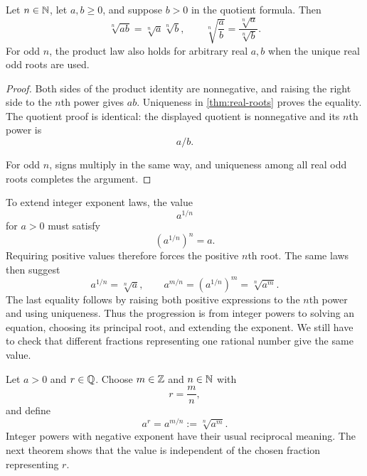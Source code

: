 \begin{proposition}
\label{prop:real-root-laws}
Let \(n\in\mathbb{N}\), let \(a,b\geq0\), and suppose \(b>0\) in the quotient
formula. Then
\[
\sqrt[n]{ab}=\sqrt[n]{a}\sqrt[n]{b},
\qquad
\sqrt[n]{\frac ab}=\frac{\sqrt[n]{a}}{\sqrt[n]{b}}.
\]
For odd \(n\), the product law also holds for arbitrary real \(a,b\) when
the unique real odd roots are used.
\end{proposition}
\begin{proof}
Both sides of the product identity are nonnegative, and raising the right
side to the \(n\)th power gives \(ab\). Uniqueness in
\cref{thm:real-roots} proves the equality. The quotient proof is identical:
the displayed quotient is nonnegative and its \(n\)th power is
\[
a/b.
\]

For odd \(n\), signs multiply in the same way, and uniqueness among all real
odd roots completes the argument.
\end{proof}

To extend integer exponent laws, the value
\[
a^{1/n}
\]
 for $a>0$ must
satisfy
\[
(a^{1/n})^n=a.
\]
 Requiring positive values therefore forces the
positive $n$th root. The same laws then suggest
\[
a^{1/n}=\sqrt[n]{a},\qquad
a^{m/n}=(a^{1/n})^m=\sqrt[n]{a^m}.
\]
The last equality follows by raising both positive expressions to the
$n$th power and using uniqueness. Thus the progression is from integer
powers to solving an equation, choosing its principal root, and extending
the exponent. We still have to check that different fractions representing
one rational number give the same value.

\begin{definition}
\label{def:rational-powers}
Let \(a>0\) and \(r\in\mathbb{Q}\). Choose \(m\in\mathbb{Z}\) and \(n\in\mathbb{N}\) with
\[
r=\frac mn,
\]
and define
\[
\boxed{a^r=a^{m/n}:=\sqrt[n]{a^m}.}
\]
Integer powers with negative exponent have their usual reciprocal meaning.
The next theorem shows that the value is independent of the chosen fraction
representing \(r\).
\end{definition}

